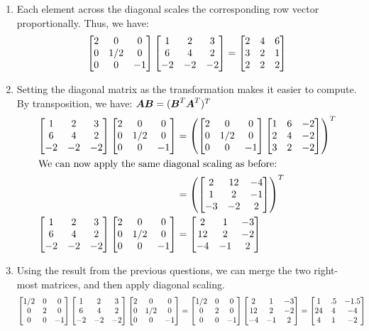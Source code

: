 \documentclass[]{exam}
\begin{document}
\begin{questions}

\question
\hfill

\begin{enumerate}[label=\arabic*.]
	\item Each element across the diagonal scales the corresponding row vector proportionally. Thus, we have:
		$$\begin{bmatrix} 2 & 0 & 0 \\ 0 & 1/2 & 0 \\ 0 & 0 & -1 \end{bmatrix} \begin{bmatrix}  1 & 2 & 3 \\ 6 & 4 & 2 \\ -2 & -2 & -2  \end{bmatrix} = \begin{bmatrix}  2 & 4 & 6 \\ 3 & 2 & 1 \\ 2 & 2 & 2  \end{bmatrix}$$
	\item Setting the diagonal matrix as the transformation makes it easier to compute. By transposition, we have: $\boldsymbol{A} \boldsymbol{B} = (\boldsymbol{B}^T \boldsymbol{A}^T)^T$
		\begin{align*}
			\begin{bmatrix}  1 & 2 & 3 \\ 6 & 4 & 2 \\ -2 & -2 & -2  \end{bmatrix} \begin{bmatrix} 2 & 0 & 0 \\ 0 & 1/2 & 0 \\ 0 & 0 & -1 \end{bmatrix} &=
			\left( \begin{bmatrix} 2 & 0 & 0 \\ 0 & 1/2 & 0 \\ 0 & 0 & -1 \end{bmatrix} \begin{bmatrix}  1 & 6 & -2 \\ 2 & 4 & -2 \\ 3 & 2 & -2  \end{bmatrix} \right)^T \\
			\intertext{We can now apply the same diagonal scaling as before:}
			 &= \left( \begin{bmatrix}  2 & 12 & -4 \\ 1 & 2 & -1 \\ -3 & -2 & 2  \end{bmatrix} \right)^T \\
			 \begin{bmatrix}  1 & 2 & 3 \\ 6 & 4 & 2 \\ -2 & -2 & -2  \end{bmatrix} \begin{bmatrix} 2 & 0 & 0 \\ 0 & 1/2 & 0 \\ 0 & 0 & -1 \end{bmatrix} &= \begin{bmatrix}  2 & 1 & -3 \\ 12 & 2 & -2 \\ -4 & -1 & 2  \end{bmatrix}
		\end{align*}
	\item Using the result from the previous questions, we can merge the two right-most matrices, and then apply diagonal scaling.
		\begin{align*}
			\bmat{1/2 & 0 & 0 \\ 0 & 2 & 0 \\ 0 & 0 & -1} \bmat{ 1 & 2 & 3 \\ 6 & 4 & 2 \\ -2 & -2 & -2 } \bmat{2 & 0 & 0 \\ 0 & 1/2 & 0 \\ 0 & 0 & -1} &= \bmat{1/2 & 0 & 0 \\ 0 & 2 & 0 \\ 0 & 0 & -1} \bmat{ 2 & 1 & -3 \\ 12 & 2 & -2 \\ -4 & -1 & 2 } = \bmat{ 1 & .5 & -1.5 \\ 24 & 4 & -4 \\ 4 & 1 & -2 }

\end{align*}
\end{enumerate}
\end{questions}
\end{document}
